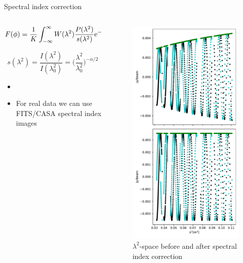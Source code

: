 \documentclass[xetex,aspectratio=169]{beamer}
\begin{document}
    \begin{frame}{Spectral index correction}
        \begin{columns}[onlytextwidth,t]
        \begin{column}{.5\textwidth}
            \begin{equation*}
                F(\phi) = \frac{1}{K}\int_{-\infty}^{\infty}{W(\lambda^2)\frac{P(\lambda^2)}{s(\lambda^2)} {\rm e}^{-2i\phi \lambda^2}~{\rm d}\lambda^2 }
            \end{equation*}
            
            \begin{equation*}
                s(\lambda^2) = \frac{I(\lambda^2)}{I(\lambda^2_0)} = \biggl(\frac{\lambda^2}{\lambda^2_0}\biggr)^{-\alpha/2}
            \end{equation*}
            \vspace{1cm}
            \begin{itemize}
                \item \cite{brentjens}
                \item For real data we can use FITS/CASA spectral index images
            \end{itemize}
        \end{column}
        
        \begin{column}{.5\textwidth}
            \begin{figure}
                \centering
                \includegraphics[width=.4\textwidth]{figures/dataset_features/spectral_index_correction.pdf}
                \caption*{$\lambda^2$-space before and after spectral index correction}
            \end{figure}
        \end{column}
            
        \end{columns}
    \end{frame}
    
\end{document}
